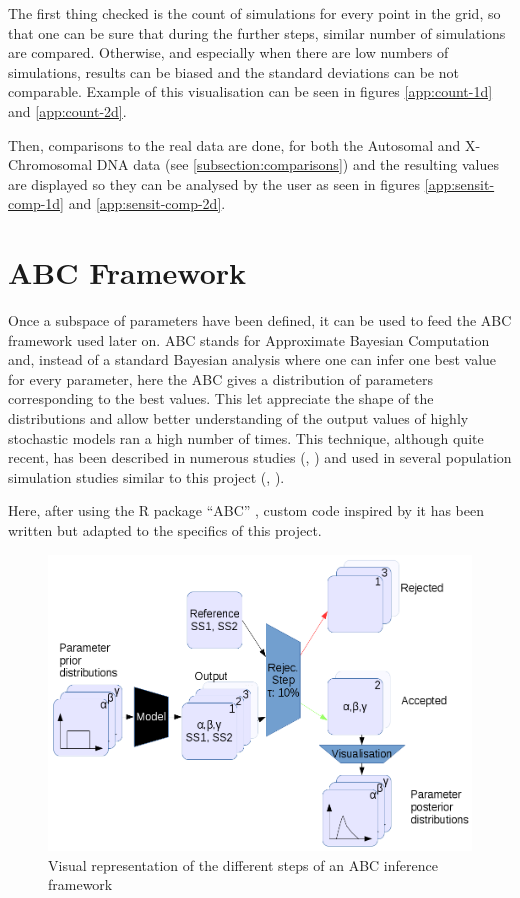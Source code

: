 \documentclass[a4paper,12pt]{report}
\begin{document}
The first thing checked is the count of simulations for every point in the grid, so that one can be sure that during the further steps, similar number of simulations are compared. Otherwise, and especially when there are low numbers of simulations, results can be biased and the standard deviations can be not comparable. Example of this visualisation can be seen in figures \ref{app:count-1d} and \ref{app:count-2d}.

Then, comparisons to the real data are done, for both the Autosomal and X-Chromosomal DNA data (see \ref{subsection:comparisons}) and the resulting values are displayed so they can be analysed by the user as seen in figures \ref{app:sensit-comp-1d} and \ref{app:sensit-comp-2d}.


\section{ABC Framework}
Once a subspace of parameters have been defined, it can be used to feed the ABC framework used later on. ABC stands for Approximate Bayesian Computation and, instead of a standard Bayesian analysis where one can infer one best value for every parameter, here the ABC gives a distribution of parameters corresponding to the best values. This let appreciate the shape of the distributions and allow better understanding of the output values of highly stochastic models ran a high number of times. This technique, although quite recent, has been described in numerous studies (\cite{Sun01}, \cite{Csi02}) and used in several population simulation studies similar to this project (\cite{Keh01}, \cite{Gui01}).

Here, after using the R package “ABC” \cite{Csi01}, custom code inspired by it has been written but adapted to the specifics of this project.

\begin{figure}[ht]
	\centering
	\includegraphics[scale=0.55]{../data/abc-landscape.png}
	\caption{Visual representation of the different steps of an ABC inference framework}
	\label{abc}
\end{figure}
\end{document}

